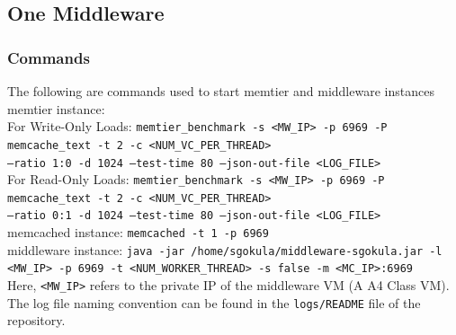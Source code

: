 \documentclass[11pt,a4paper]{article}
\newcommand\instructions[1]{\textcolor{blue}{Instructions: #1}}
\begin{document}
\subsection{One Middleware}


\subsubsection{Commands}
The following are commands used to start memtier and middleware instances \\
{\scriptsize
		memtier instance: \\
			For Write-Only Loads: \texttt{memtier\_benchmark -s <MW\_IP> -p 6969 -P memcache\_text -t 2 -c <NUM\_VC\_PER\_THREAD> \\ --ratio 1:0 -d 1024 --test-time 80 --json-out-file <LOG\_FILE>} \\
			For Read-Only Loads:  \texttt{memtier\_benchmark -s <MW\_IP> -p 6969 -P memcache\_text -t 2 -c <NUM\_VC\_PER\_THREAD> \\ --ratio 0:1 -d 1024 --test-time 80 --json-out-file <LOG\_FILE>} \\
		memcached instance: \texttt{memcached -t 1 -p 6969} \\
		middleware instance: \texttt{java -jar /home/sgokula/middleware-sgokula.jar -l <MW\_IP> -p 6969 -t <NUM\_WORKER\_THREAD> -s false -m <MC\_IP>:6969}} \\
Here, \texttt{<MW\_IP>} refers to the private IP of the middleware VM (A A4 Class VM). The log file naming convention can be found in the \texttt{logs/README} file of the repository.
\end{document}
